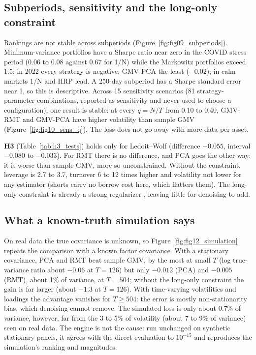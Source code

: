 \documentclass[11pt,a4paper]{article}
\begin{document}
\subsection{Subperiods, sensitivity and the long-only constraint}

Rankings are not stable across subperiods (Figure~\ref{fig:fig09_subperiods}). Minimum-variance portfolios have a
Sharpe ratio near zero in the COVID stress period (0.06 to 0.08 against 0.67 for 1/N) while the Markowitz
portfolios exceed 1.5; in 2022 every strategy is negative, GMV-PCA the least ($-0.02$); in calm markets 1/N and HRP
lead. A 250-day subperiod has a Sharpe standard error near 1, so this is descriptive. Across 15 sensitivity
scenarios (81 strategy-parameter combinations, reported as sensitivity and never used to choose a configuration),
one result is stable: at every $q=N/T$ from 0.10 to 0.40, GMV-RMT and GMV-PCA have higher volatility than sample
GMV (Figure~\ref{fig:fig10_sens_q}). The loss does not go away with more data per asset.

\textbf{H3} (Table~\ref{tab:h3_tests}) holds only for Ledoit--Wolf (difference $-0.055$, interval $-0.080$ to
$-0.033$). For RMT there is no difference, and PCA goes the other way: it is worse than sample GMV, more so
unconstrained. Without the constraint, leverage is 2.7 to 3.7, turnover 6 to 12 times higher and volatility not
lower for any estimator (shorts carry no borrow cost here, which flatters them). The long-only constraint is
already a strong regularizer \cite{jagannathanma2003}, leaving little for denoising to add.

\subsection{What a known-truth simulation says}

On real data the true covariance is unknown, so Figure~\ref{fig:fig12_simulation} repeats the comparison with a
known factor covariance. With a stationary covariance, PCA and RMT beat sample GMV, by the most at small $T$ (log
true-variance ratio about $-0.06$ at $T=126$) but only $-0.012$ (PCA) and $-0.005$ (RMT), about 1\% of variance, at
$T=504$; without the long-only constraint the gain is far larger (about $-1.3$ at $T=126$). With time-varying volatilities and loadings the advantage vanishes for $T\ge504$: the error is
mostly non-stationarity bias, which denoising cannot remove. The simulated loss is only about 0.7\% of variance,
however, far from the 3 to 5\% of volatility (about 7 to 9\% of variance) seen on real data. The engine is not the
cause: run unchanged on synthetic stationary panels, it agrees with the direct evaluation to $10^{-15}$ and
reproduces the simulation's ranking and magnitudes.
\end{document}
